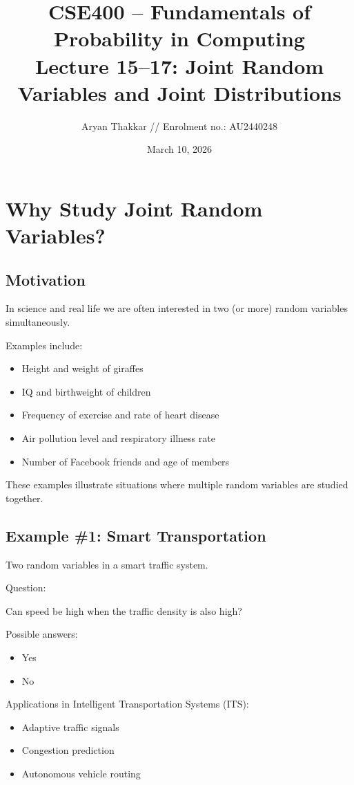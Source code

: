 \documentclass[12pt]{article}
\title{CSE400 -- Fundamentals of Probability in Computing\\
Lecture 15--17: Joint Random Variables and Joint Distributions}
\author{Aryan Thakkar // Enrolment no.: AU2440248}
\date{March 10, 2026}
\begin{document}
\maketitle

\section{Why Study Joint Random Variables?}

\subsection{Motivation}

In science and real life we are often interested in two (or more) random variables simultaneously.

Examples include:
\begin{itemize}
\item Height and weight of giraffes
\item IQ and birthweight of children
\item Frequency of exercise and rate of heart disease
\item Air pollution level and respiratory illness rate
\item Number of Facebook friends and age of members
\end{itemize}

These examples illustrate situations where multiple random variables are studied together.

\subsection{Example \#1: Smart Transportation}

Two random variables in a smart traffic system.

Question:

Can speed be high when the traffic density is also high?

Possible answers:
\begin{itemize}
\item Yes
\item No
\end{itemize}

Applications in Intelligent Transportation Systems (ITS):
\begin{itemize}
\item Adaptive traffic signals
\item Congestion prediction
\item Autonomous vehicle routing
\end{itemize}
\end{document}
